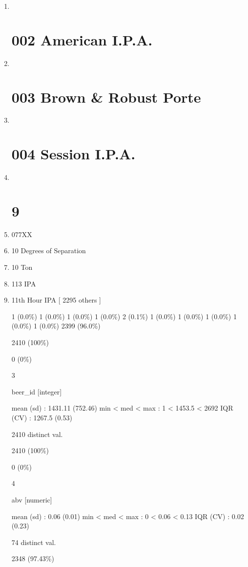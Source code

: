 \documentclass[]{article}
\begin{document}
\begin{enumerate}
\def\labelenumi{\arabic{enumi}.}
\setcounter{enumi}{1}
\item ~
  \section{002 American I.P.A.}\label{american-i.p.a.}
\item ~
  \section{003 Brown \& Robust Porte}\label{brown-robust-porte}
\item ~
  \section{004 Session I.P.A.}\label{session-i.p.a.}
\item ~
  \section{9}\label{section}
\item
  077XX
\item
  10 Degrees of Separation
\item
  10 Ton
\item
  113 IPA
\item
  11th Hour IPA {[} 2295 others {]}

  1 (0.0\%) 1 (0.0\%) 1 (0.0\%) 1 (0.0\%) 2 (0.1\%) 1 (0.0\%) 1 (0.0\%)
  1 (0.0\%) 1 (0.0\%) 1 (0.0\%) 2399 (96.0\%)

  2410 (100\%)

  0 (0\%)

  3

  beer\_id {[}integer{]}

  mean (sd) : 1431.11 (752.46) min \textless{} med \textless{} max : 1
  \textless{} 1453.5 \textless{} 2692 IQR (CV) : 1267.5 (0.53)

  2410 distinct val.

  2410 (100\%)

  0 (0\%)

  4

  abv {[}numeric{]}

  mean (sd) : 0.06 (0.01) min \textless{} med \textless{} max : 0
  \textless{} 0.06 \textless{} 0.13 IQR (CV) : 0.02 (0.23)

  74 distinct val.

  2348 (97.43\%)


\end{enumerate}
\end{document}
